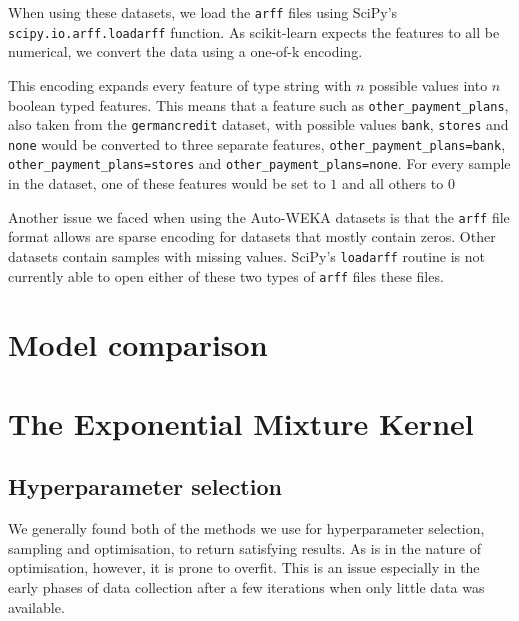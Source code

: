 \documentclass[a4paper,12pt,twoside,openright]{report}
\begin{document}
When using these datasets, we load the \texttt{arff} files using SciPy's \texttt{scipy.io.arff.loadarff} function. As scikit-learn expects the features to all be numerical, we convert the data using a one-of-k encoding.

This encoding expands every feature of type string with $n$ possible values into $n$ boolean typed features. This means that a feature such as \texttt{other\_payment\_plans}, also taken from the \texttt{germancredit} dataset, with possible values \texttt{bank}, \texttt{stores} and \texttt{none} would be converted to three separate features, \texttt{other\_payment\_plans=bank}, \texttt{other\_payment\_plans=stores} and \texttt{other\_payment\_plans=none}. For every sample in the dataset, one of these features would be set to $1$ and all others to $0$

Another issue we faced when using the Auto-WEKA datasets is that the \texttt{arff} file format allows are sparse encoding for datasets that mostly contain zeros. Other datasets contain samples with missing values. SciPy's \texttt{loadarff} routine is not currently able to open either of these two types of \texttt{arff} files these files.


\section{Model comparison}


\section{The Exponential Mixture Kernel}




\subsection{Hyperparameter selection}
We generally found both of the methods we use for hyperparameter selection, sampling and optimisation, to return satisfying results. As is in the nature of optimisation, however, it is prone to overfit. This is an issue especially in the early phases of data collection after a few iterations when only little data was available.
\end{document}
